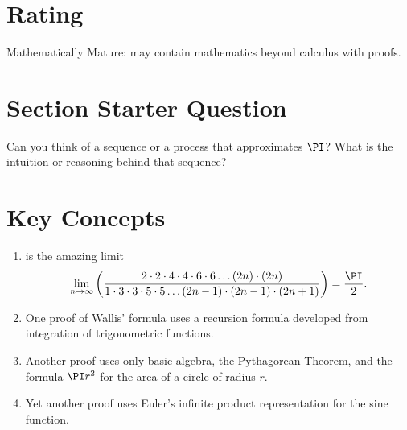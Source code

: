 \documentclass[12pt]{article}
\begin{document}
\myheader \mytitle

\hr


\hr

\usefirefox

\hr

\section*{Rating} %
Mathematically Mature:  may contain mathematics beyond calculus with
proofs. %

\hr

\section*{Section Starter Question} Can you think of a sequence or a
process that approximates \( \PI \)?  What is the intuition or reasoning
behind that sequence?

\hr

\section*{Key Concepts}

\begin{enumerate}
    \item
         is the amazing limit
        \[
            \lim_{n \to \infty} \left( \frac{ 2 \cdot 2 \cdot 4 \cdot 4
            \cdot 6 \cdot 6 \dots (2n) \cdot (2n)}{1 \cdot 3 \cdot 3
            \cdot 5 \cdot 5 \dots (2n-1) \cdot (2n-1)\cdot(2n+1)} \right)
            = \frac{\PI}{2}.
        \]
    \item
        One proof of Wallis' formula uses a recursion formula developed
        from integration of trigonometric functions.
    \item
        Another proof uses only basic algebra, the Pythagorean Theorem,
        and the formula \( \PI r^2 \) for the area of a circle of radius
        \( r \).
    \item
        Yet another proof uses Euler's infinite product representation
        for the sine function.
\end{enumerate}
\end{document}
